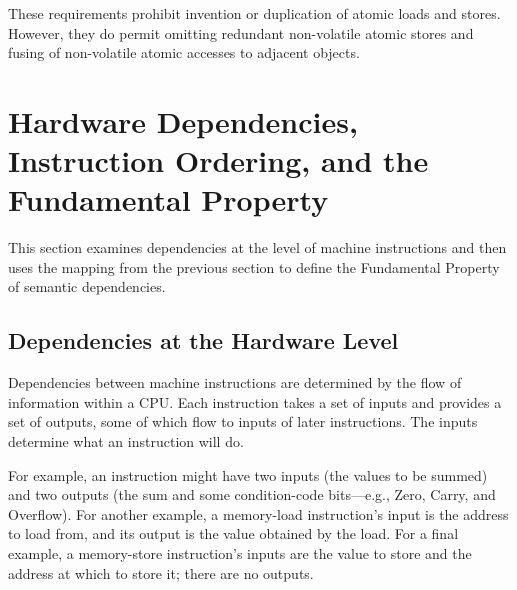 These requirements prohibit
invention or duplication of atomic loads and stores.
However, they do permit omitting
redundant non-volatile atomic stores and fusing of non-volatile atomic
accesses to adjacent objects.

\section{Hardware Dependencies, Instruction Ordering, and the
Fundamental Property}
\label{sec:Hardware Dependencies, Instruction Ordering, and the
Fundamental Property}

This section examines dependencies at the level of machine instructions
and then uses the mapping from the previous section to define the
Fundamental Property of semantic dependencies.

\subsection{Dependencies at the Hardware Level}
\label{sec:Dependencies at the Hardware Level}

Dependencies between machine instructions are determined by the flow of
information within a CPU.
Each instruction takes a set of inputs and provides a set of outputs,
some of which flow to inputs of later instructions.
The inputs determine what an instruction will do.

For example, an  instruction might have two inputs (the values to
be summed) and two outputs (the sum and some condition-code bits---e.g.,
Zero, Carry, and Overflow).
For another example, a memory-load instruction's input is the address
to load from, and its output is the value obtained by the load.
For a final example, a memory-store instruction's inputs are the value
to store and the address at which to store it; there are no outputs.

